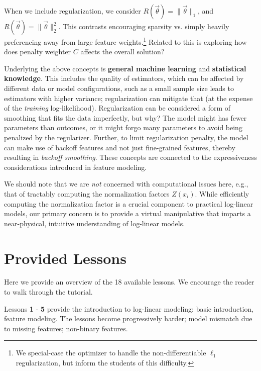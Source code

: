 \documentclass[11pt,letterpaper]{article}
\newcommand{\Note}[1]{}
\renewcommand{\Note}[1]{\hl{[#1]}}
\newcommand{\NoteSigned}[3]{{\sethlcolor{#2}\Note{#1: #3}}}
\newcommand{\NoteFF}[1]{\NoteSigned{FF}{LightBlue}{#1}}
\newcommand{\NumLessons}[0]{18}%
\begin{document}
When we include regularization, we consider $R(\vec{\theta}) = \|\vec\theta\|_1$, and 
$R(\vec{\theta}) = \|\vec{\theta}\|_2^2$. This contrasts encouraging sparsity vs. simply 
heavily preferencing away from large feature weights.\footnote{We special-case the optimizer 
to handle the non-differentiable $\ell_1$ regularization, but inform the students of this difficulty.} 
Related to this is exploring how does  penalty weighter $C$ affects the overall solution?

Underlying the above concepts is \textbf{general machine learning} and 
\textbf{statistical knowledge}. This includes the quality of estimators, 
which can be affected by different data or model configurations, such 
as a small sample size leads to estimators with 
higher variance; regularization can mitigate that (at the expense of 
the \textit{training} log-likelihood). 
Regularization can be considered a form of smoothing that fits the data 
imperfectly, but why? The model might has fewer parameters than 
outcomes, or it might forgo many parameters to avoid being penalized by 
the regularizer.  Further, to limit regularization penalty, the model can make 
use of backoff features and not just fine-grained features, thereby resulting 
in \textit{backoff smoothing}. These concepts are connected to the expressiveness 
considerations introduced in feature modeling.

We should note that we are \textit{not} concerned with computational issues here, e.g., that of tractably computing the normalization factors $Z(x_i)$. While efficiently computing the normalization factor is a crucial component to practical log-linear models, our primary concern is to provide a virtual manipulative that imparts a near-physical, intuitive understanding of log-linear models. 



\section{Provided Lessons}\label{sec:lessons}
Here we provide an overview of the \NumLessons{} available lessons. We encourage the reader to 
walk through the tutorial.

Lessons \textbf{1} - \textbf{5} provide the introduction to log-linear modeling: basic introduction, feature modeling. The lessons become progressively harder; model mismatch due to missing features; non-binary features.
\end{document}
